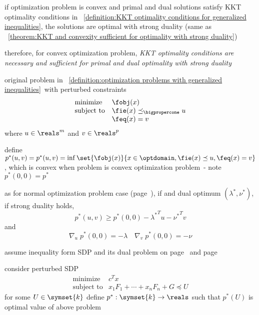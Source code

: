 \documentclass[17pt,landscape]{foils}
\begin{document}
{		\viitem
			if optimization problem is convex and
			primal and dual solutions satisfy KKT optimality conditions
			in ~\ref{definition:KKT optimality conditions for generalized inequalities},
			the solutions are optimal with strong duality
			(same as \theoremname~\ref{theorem:KKT and convexity sufficient for optimality with strong duality})

		\viitem
			therefore,
			for convex optimization problem,
			\emph{KKT optimality conditions are necessary and sufficient
			for primal and dual optimality with strong duality}
		\eit
	\eit
\eit
\vfill



\bit
\item
	original problem in ~\ref{definition:optimization problems with generalized inequalities}\
	with perturbed constraints
	$$
		\begin{array}{ll}
			\mbox{minimize} &
				\fobj(x)
			\\
			\mbox{subject to} &
				\fie(x) \preceq_\bigpropercone u
			\\ &
				\feq(x) =v
		\end{array}
	$$
	where $u\in\reals^m$ and $v\in\reals^p$

\vitem
	define $p^\ast(u,v) = p^\ast(u,v) = \inf\set{\fobj(x)}{x\in\optdomain, \fie(x) \preceq u, \feq(x) = v}$,
	which is convex when problem is convex optimization problem\
	- note
		$p^\ast(0,0)=p^\ast$

\vitem
	as for normal optimization problem case (page~\pageref{page:Perturbed optimization problems}),
	if and dual optimum $(\lambda^\ast,\nu^\ast)$,
	if strong duality holds,
	$$
		p^\ast(u,v)\geq p^\ast(0,0) - {\lambda^\ast}^T u - {\nu^\ast}^T v
	$$
	and
	$$
		\nabla_u\; p^\ast (0,0) = -\lambda
		\quad
		\nabla_v\; p^\ast (0,0) = -\nu
	$$
\eit



\bit
\item
	assume inequality form SDP and its dual problem
	on page~\pageref{page:(inequality form) SDP} and page~\pageref{page:dual of SDP}\

\vitem
	consider perturbed SDP
	$$
		\begin{array}{ll}
			\mbox{minimize} &
				c^Tx
			\\
			\mbox{subject to} &
				x_1F_1 + \cdots + x_nF_n + G \preceq U
		\end{array}
	$$
	for some $U\in\symset{k}$
	\bit
	\vitem
		define $p^\ast:\symset{k} \to \reals$
		such that
		$p^\ast(U)$ is optimal value of above problem
	\eit

}
\end{document}
